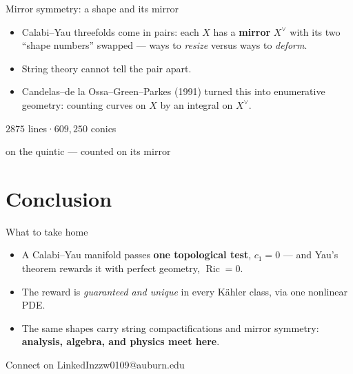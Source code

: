 \documentclass[aspectratio=169]{beamer}
\begin{document}
\begin{frame}{Mirror symmetry: a shape and its mirror}
  \begin{itemize}
    \item Calabi–Yau threefolds come in pairs: each $X$ has a
          \textbf{mirror} $X^{\vee}$ with its two ``shape numbers''
          swapped — ways to \emph{resize} versus ways to \emph{deform}.
    \item String theory cannot tell the pair apart.
    \item Candelas–de la Ossa–Green–Parkes (1991) turned this into
          enumerative geometry: counting curves on $X$ by an integral
          on $X^{\vee}$.
  \end{itemize}
  \vspace{0.4em}
  \begin{center}
    {\KeynoteSemibold\fontsize{20}{24}\selectfont\color{AUorange}
     $2875$ lines\quad·\quad$609{,}250$ conics}\par
    \vspace{0.25em}
    {\KeynoteLight\fontsize{11}{14}\selectfont\color{Quiet}
     on the quintic — counted on its mirror\par}
  \end{center}
\end{frame}

\section{Conclusion}

\begin{frame}{What to take home}
  \begin{itemize}
    \item A Calabi–Yau manifold passes \textbf{one topological test},
          $c_1 = 0$ — and Yau's theorem rewards it with perfect geometry,
          $\operatorname{Ric} = 0$.
    \item The reward is \emph{guaranteed and unique} in every Kähler class,
          via one nonlinear PDE.
    \item The same shapes carry string compactifications and mirror
          symmetry: \textbf{analysis, algebra, and physics meet here}.
  \end{itemize}
\end{frame}

%
  {Connect on LinkedIn}{zzw0109@auburn.edu}
\end{document}
